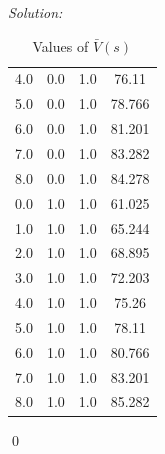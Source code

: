 \documentclass[12pt]{article}
\newenvironment{problem}[2][Problem]{\begin{trivlist}
\item[\hskip \labelsep {\bfseries #1}\hskip \labelsep {\bfseries #2.}]}{\end{trivlist}}
\newenvironment{sol}
    {\emph{Solution:}
    }
    {
    \qed
    }
\begin{document}
\begin{sol}
\begin{table}
\begin{tabular}{|c|c|c|c|}
            4.0 & 0.0 & 1.0 & 76.11 \\
            5.0 & 0.0 & 1.0 & 78.766 \\
            6.0 & 0.0 & 1.0 & 81.201 \\
            7.0 & 0.0 & 1.0 & 83.282 \\
            8.0 & 0.0 & 1.0 & 84.278 \\
            0.0 & 1.0 & 1.0 & 61.025 \\
            1.0 & 1.0 & 1.0 & 65.244 \\
            2.0 & 1.0 & 1.0 & 68.895 \\
            3.0 & 1.0 & 1.0 & 72.203 \\
            4.0 & 1.0 & 1.0 & 75.26 \\
            5.0 & 1.0 & 1.0 & 78.11 \\
            6.0 & 1.0 & 1.0 & 80.766 \\
            7.0 & 1.0 & 1.0 & 83.201 \\
            8.0 & 1.0 & 1.0 & 85.282 \\
            \hline
        \end{tabular}
        \caption{Values of $\bar{V}(s)$}
    \end{table}
\end{sol}
\begin{problem}{2}
\end{problem}
\end{document}
